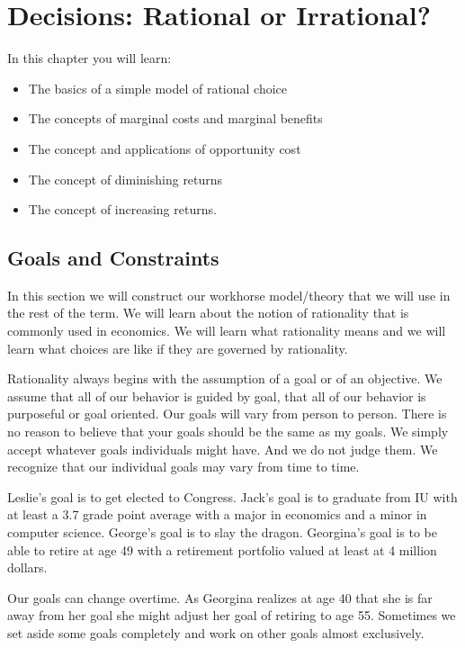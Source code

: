 \documentclass[
]{book}
\providecommand{\tightlist}{%
  \setlength{\itemsep}{0pt}\setlength{\parskip}{0pt}}
\begin{document}
\hypertarget{decisions-rational-or-irrational}{%
\chapter{Decisions: Rational or Irrational?}\label{decisions-rational-or-irrational}}

In this chapter you will learn:

\begin{itemize}
\tightlist
\item
  The basics of a simple model of rational choice
\item
  The concepts of marginal costs and marginal benefits
\item
  The concept and applications of opportunity cost
\item
  The concept of diminishing returns
\item
  The concept of increasing returns.
\end{itemize}

\hypertarget{goals-and-constraints}{%
\section{Goals and Constraints}\label{goals-and-constraints}}

In this section we will construct our workhorse model/theory that we will use in the rest of the term. We will learn about the notion of rationality that is commonly used in economics. We will learn what rationality means and we will learn what choices are like if they are governed by rationality.

Rationality always begins with the assumption of a goal or of an objective. We assume that all of our behavior is guided by goal, that all of our behavior is purposeful or goal oriented. Our goals will vary from person to person. There is no reason to believe that your goals should be the same as my goals. We simply accept whatever goals individuals might have. And we do not judge them. We recognize that our individual goals may vary from time to time.

Leslie's goal is to get elected to Congress. Jack's goal is to graduate from IU with at least a 3.7 grade point average with a major in economics and a minor in computer science. George's goal is to slay the dragon. Georgina's goal is to be able to retire at age 49 with a retirement portfolio valued at least at 4 million dollars.

Our goals can change overtime. As Georgina realizes at age 40 that she is far away from her goal she might adjust her goal of retiring to age 55. Sometimes we set aside some goals completely and work on other goals almost exclusively.
\end{document}
